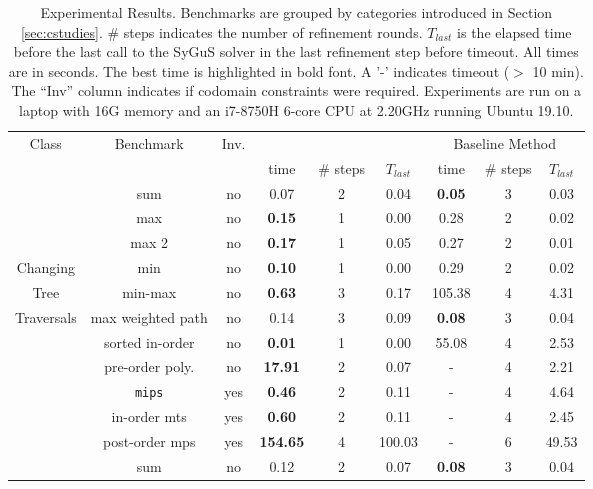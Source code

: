 \begin{table}
	\caption{Experimental Results.  Benchmarks are grouped by categories introduced in Section \ref{sec:cstudies}. \# steps indicates the number of refinement rounds. $T_{last}$ is the elapsed time before the last call to the SyGuS solver in the last refinement step before timeout. All times are in seconds. The best time is highlighted in bold font.  A '-' indicates timeout ($>$ 10 min). The ``Inv'' column indicates if codomain constraints were required. Experiments are run on a laptop with 16G memory and an i7-8750H 6-core CPU at 2.20GHz running Ubuntu 19.10.}\label{table:experiments}
	{
		\begin{tabular}[h]{|c|c|c|c|c|c||c|c|c|}
			\hline
			 \multirow{2}{*}{Class} &                 \multirow{2}{*}{Benchmark} &                   \multirow{2}{*}{Inv.} &                    \multicolumn{3}{c||}{\tool} &                     \multicolumn{3}{c|}{Baseline Method}\\ 
			\cline{4-9}
			 &   & & time & \# steps & $T_{last}$ & time & \# steps & $T_{last}$\\ 
			\hline
			 & sum & no & 0.07 & 2 & 0.04 & {\bfseries 0.05} & 3 & 0.03\\ 
			 & max & no & {\bfseries 0.15} & 1 & 0.00 & 0.28 & 2 & 0.02\\ 
			 & max 2 & no & {\bfseries 0.17} & 1 & 0.05 & 0.27 & 2 & 0.01\\ 
			Changing & min & no & {\bfseries 0.10} & 1 & 0.00 & 0.29 & 2 & 0.02\\ 
			Tree & min-max & no & {\bfseries 0.63} & 3 & 0.17 & 105.38 & 4 & 4.31\\ 
			Traversals & max weighted path & no & 0.14 & 3 & 0.09 & {\bfseries 0.08} & 3 & 0.04\\ 
			 & sorted in-order & no & {\bfseries 0.01} & 1 & 0.00 & 55.08 & 4 & 2.53\\ 
			 & pre-order poly. & no & {\bfseries 17.91} & 2 & 0.07 & - & 4 & 2.21\\ 
			 & {\tt mips} & yes & {\bfseries 0.46} & 2 & 0.11 & - & 4 & 4.64\\ 
			 & in-order mts & yes & {\bfseries 0.60} & 2 & 0.11 & - & 4 & 2.45\\ 
			 & post-order mps & yes & {\bfseries 154.65} & 4 & 100.03 & - & 6 & 49.53\\ 
			\hline
			 & sum & no & 0.12 & 2 & 0.07 & {\bfseries 0.08} & 3 & 0.04\\ 

\end{tabular}}
\end{table}
